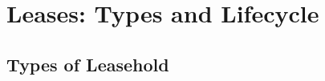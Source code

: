 \chapter{Leases: Types and Lifecycle}






\section{Types of Leasehold}







\begin{questions}

\end{questions}



%

%


%


%




%


%


